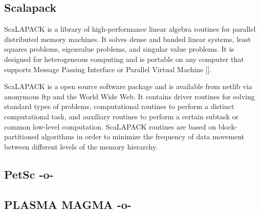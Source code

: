 \subsection{Scalapack}

ScaLAPACK is a library of high-performance linear algebra routines for
parallel distributed memory machines. It solves dense and banded
linear systems, least squares problems, eigenvalue problems, and
singular value problems. It is designed for heterogeneous computing
and is portable on any computer that supports Message Passing
Interface or Parallel Virtual Machine [\cite{www-scalapack}].

ScaLAPACK is a open source software package and is available from
netlib via anonymous ftp and the World Wide Web. It contains driver
routines for solving standard types of problems, computational
routines to perform a distinct computational task, and auxiliary
routines to perform a certain subtask or common low-level
computation. ScaLAPACK routines are based on block-partitioned
algorithms in order to minimize the frequency of data movement between
different levels of the memory hierarchy.
    
\subsection{PetSc -o-}



\subsection{PLASMA MAGMA -o-}


